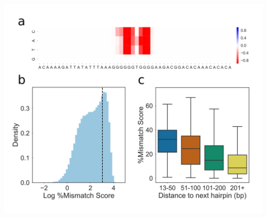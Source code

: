 \documentclass[12pt,a4paper,]{report}
\let\origfigure=\figure
\let\endorigfigure=\endfigure
\renewenvironment{figure}[1][2] {
    \expandafter\origfigure\expandafter[H]
} {
    \endorigfigure
}
\begin{document}
\begin{figure}[htbp]
\centering
\includegraphics[width=\textwidth,height=562pt,keepaspectratio]{chapter_3/figures/g_hairpin.png}
\caption[Identification of G-hairpin structures by G4Seeqer Mutation Maps]{\textbf{Identification   of   G-hairpin   structures   by   G4Seeqer   Mutation   Maps}   \textbf{a)}   Mutation   map   showing   the   a   high   scoring   (0.99)   G4Seeqer   motif   which   may   form   a   G-hairpin.   Mutation   of   any   base   in   the   core   motif   is   sufficient   to   reduce   the   score   by   up   to   80\%.   \textbf{b)}   Histogram   of   log   percentage   mismatch   score   for   motifs   conforming   to   a   G-hairpin   like   pattern.   The   bimodal   distribution   suggests   that   many   of   these   motifs   form   structures   which   disrupt   polymerase   in   the   presence   of   potassium.   \textbf{c)}   Boxplot   showing   the   relationship   between   \%mm   score   and   distance   to   next   G-hairpin   for   G-hairpin   structures.   The   negative   correlation   suggests   G-hairpins   might   interact   with   other   relatively   distant   hairpins   to   form   G4s.   \label{hairpin}}
\end{figure}
\end{document}
